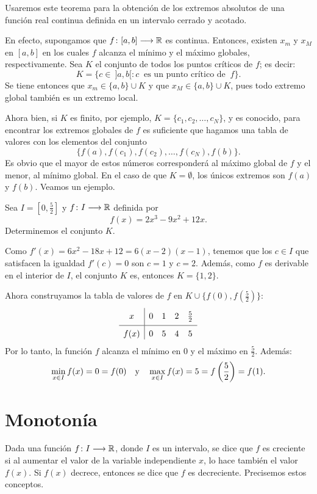 Usaremos este teorema para la obtención de los extremos absolutos de una función real continua
definida en un intervalo cerrado y acotado.

En efecto, supongamos que $f\colon [a,b]\longrightarrow \mathbb{R}$ es continua. Entonces, existen $x_m$ y $x_M$ en
$[a,b]$ en los cuales $f$ alcanza el mínimo y el máximo globales, respectivamente. Sea $K$ el
conjunto de todos los puntos críticos de $f$; es decir:
\[
K = \{c \in \ ]a,b[ : c \ \text{ es un punto crítico de } \ f\}.
\]
Se tiene entonces que $x_m\in \{a,b\}\cup K$ y que $x_M\in \{a,b\}\cup K$, pues todo extremo global
también es un extremo local.

Ahora bien, si $K$ es finito, por ejemplo, $K = \{c_1, c_2,\ldots, c_N\}$, y es conocido, para
encontrar los extremos globales de $f$ es suficiente que hagamos una tabla de valores con los
elementos del conjunto
\[
\{f(a), f(c_1), f(c_2), \ldots, f(c_N), f(b)\}.
\]
Es obvio que el mayor de estos números corresponderá al máximo global de $f$ y el menor, al mínimo
global. En el caso de que $K = \emptyset$, los únicos extremos son $f(a)$ y $f(b)$. Veamos un
ejemplo.

\begin{exemplo}[]{}
Sea $I = [0,\frac{5}{2}]$ y $f\colon I\longrightarrow \mathbb{R}$ definida por
\[
f(x) = 2x^3 - 9x^2 + 12x.
\]
Determinemos el conjunto $K$.

Como $f'(x) = 6x^2 - 18x + 12 = 6(x - 2)(x-1)$, tenemos que los $c\in I$ que satisfacen la igualdad
$f'(c) = 0$ son $c = 1$ y $c = 2$. Además, como $f$ es derivable en el interior de $I$, el conjunto
$K$ es, entonces $K = \{1,2\}$.

Ahora construyamos la tabla de valores de $f$ en $K \cup \{f(0),f(\frac{5}{2})\}$:
\[
\setlength\extrarowheight{4pt}
\begin{array}{c|cccc}
x & 0 & 1 & 2 & \frac{5}{2} \\[4pt] \hline
f(x) & 0 & 5 & 4 & 5
\end{array}
\]
Por lo tanto, la función $f$ alcanza el mínimo en $0$ y el máximo en $\frac{5}{2}$. Además:
\[
\min_{x\in I} f(x) = 0 = f(0) \quad\text{y}\quad \max_{x\in I} f(x) = 5 = f\left(\frac{5}{2}\right)=f(1).
\]
\end{exemplo}

\section{Monotonía}

Dada una función $f\colon I\longrightarrow \mathbb{R}$, donde $I$ es un intervalo, se dice que $f$ es creciente si
al aumentar el valor de la variable independiente $x$, lo hace también el valor $f(x)$. Si $f(x)$
decrece, entonces se dice que $f$ es decreciente. Precisemos estos conceptos.

